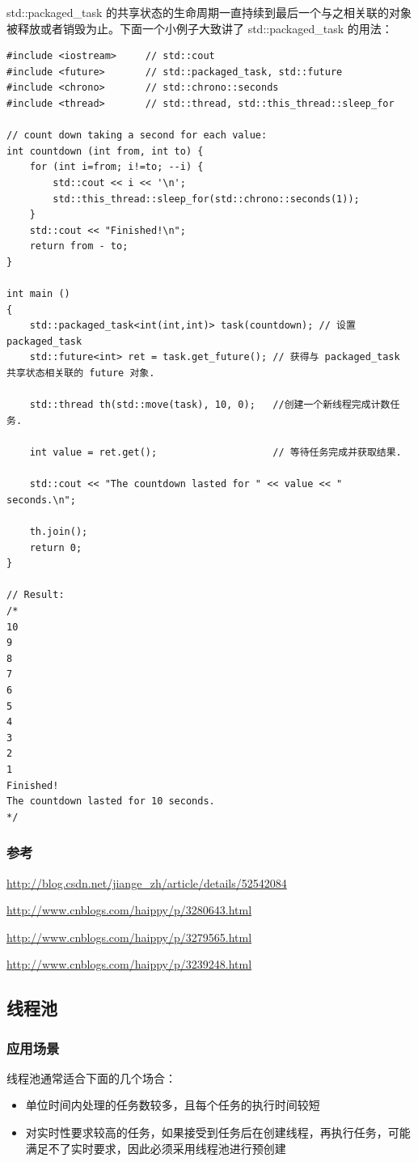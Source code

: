 \documentclass[UTF8,a4paper,12pt]{ctexbook}
\begin{document}
			std::packaged\_task 的共享状态的生命周期一直持续到最后一个与之相关联的对象被释放或者销毁为止。下面一个小例子大致讲了 std::packaged\_task 的用法：
			\begin{lstlisting}
#include <iostream>     // std::cout
#include <future>       // std::packaged_task, std::future
#include <chrono>       // std::chrono::seconds
#include <thread>       // std::thread, std::this_thread::sleep_for

// count down taking a second for each value:
int countdown (int from, int to) {
	for (int i=from; i!=to; --i) {
		std::cout << i << '\n';
		std::this_thread::sleep_for(std::chrono::seconds(1));
	}
	std::cout << "Finished!\n";
	return from - to;
}

int main ()
{
	std::packaged_task<int(int,int)> task(countdown); // 设置 packaged_task
	std::future<int> ret = task.get_future(); // 获得与 packaged_task 共享状态相关联的 future 对象.
	
	std::thread th(std::move(task), 10, 0);   //创建一个新线程完成计数任务.
	
	int value = ret.get();                    // 等待任务完成并获取结果.
	
	std::cout << "The countdown lasted for " << value << " seconds.\n";
	
	th.join();
	return 0;
}	

// Result:
/*
10
9
8
7
6
5
4
3
2
1
Finished!
The countdown lasted for 10 seconds.
*/			
			\end{lstlisting}
		\subsubsection{参考}
			\url{http://blog.csdn.net/jiange_zh/article/details/52542084}

			\url{http://www.cnblogs.com/haippy/p/3280643.html}
			
			\url{http://www.cnblogs.com/haippy/p/3279565.html}
			
			\url{http://www.cnblogs.com/haippy/p/3239248.html}
	\subsection{线程池}
		\subsubsection{应用场景}线程池通常适合下面的几个场合：
			\begin{itemize}
				\item 单位时间内处理的任务数较多，且每个任务的执行时间较短
				\item 对实时性要求较高的任务，如果接受到任务后在创建线程，再执行任务，可能满足不了实时要求，因此必须采用线程池进行预创建
			\end{itemize}
		
\end{document}
